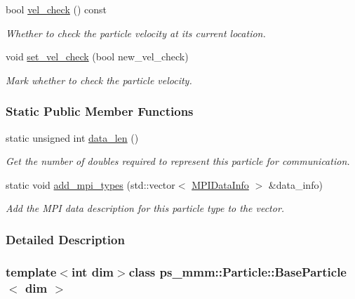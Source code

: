\begin{DoxyCompactItemize}
bool \hyperlink{classps__mmm_1_1_particle_1_1_base_particle_aab49d59001b9679f06fc7638364c3dac}{vel\+\_\+check} () const 
\begin{DoxyCompactList}\small\item\em Whether to check the particle velocity at its current location. \end{DoxyCompactList}\item 
void \hyperlink{classps__mmm_1_1_particle_1_1_base_particle_a40e7fa8899bc18bfad5a0e1c47fee143}{set\+\_\+vel\+\_\+check} (bool new\+\_\+vel\+\_\+check)
\begin{DoxyCompactList}\small\item\em Mark whether to check the particle velocity. \end{DoxyCompactList}\end{DoxyCompactItemize}
\subsubsection*{Static Public Member Functions}
\begin{DoxyCompactItemize}
\item 
static unsigned int \hyperlink{classps__mmm_1_1_particle_1_1_base_particle_a75ff7fdc7b6a8060c5d86008a10f53d7}{data\+\_\+len} ()
\begin{DoxyCompactList}\small\item\em Get the number of doubles required to represent this particle for communication. \end{DoxyCompactList}\item 
static void \hyperlink{classps__mmm_1_1_particle_1_1_base_particle_adf3cdd24dc6c7980eaf170e228d26d27}{add\+\_\+mpi\+\_\+types} (std\+::vector$<$ \hyperlink{classps__mmm_1_1_particle_1_1_m_p_i_data_info}{M\+P\+I\+Data\+Info} $>$ \&data\+\_\+info)
\begin{DoxyCompactList}\small\item\em Add the M\+P\+I data description for this particle type to the vector. \end{DoxyCompactList}\end{DoxyCompactItemize}


\subsubsection{Detailed Description}
\subsubsection*{template$<$int dim$>$class ps\+\_\+mmm\+::\+Particle\+::\+Base\+Particle$<$ dim $>$}

